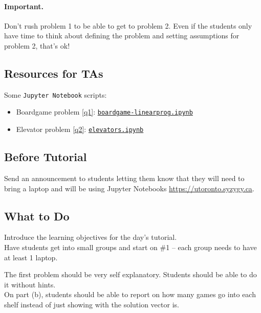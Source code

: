 \paragraph{Important.} Don't rush problem 1 to be able to get to problem 2. Even if the students only have time to think about defining the problem and setting assumptions for problem 2, that's ok!


\subsection*{Resources for TAs}

Some \texttt{Jupyter Notebook} scripts:

\begin{itemize}
	\item Boardgame problem \ref{q1}: \href{https://utoronto.syzygy.ca/jupyter/user-redirect/git-pull?repo=https://github.com/bigfatbernie/IBLMathModeling&subPath=tutorials/tutorial2/boardgame-linearprog.ipynb}{\tt boardgame-linearprog.ipynb}
	\item Elevator problem \ref{q2}: \href{https://utoronto.syzygy.ca/jupyter/user-redirect/git-pull?repo=https://github.com/bigfatbernie/IBLMathModeling&subPath=tutorials/tutorial2/elevators.ipynb}{\tt elevators.ipynb}
\end{itemize}


\subsection*{Before Tutorial}

Send an announcement to students letting them know that they will need to bring a laptop and will be using Jupyter Notebooks \url{https://utoronto.syzygy.ca}.


\subsection*{What to Do}
	
Introduce the learning objectives for the day's tutorial. \\

Have students get into small groups and start on \#1 -- each group needs to have at least 1 laptop. 

The first problem should be very self explanatory. Students should be able to do it without hints. \\

On part (b), students should be able to report on how many games go into each shelf instead of just showing with the solution vector is.\\

